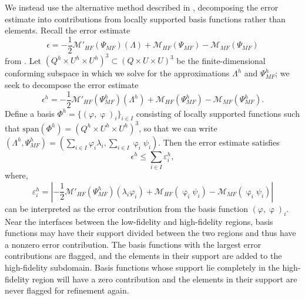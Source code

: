 \documentclass[review,sort&compress]{elsarticle}
\theoremstyle{plain} %
\theoremstyle{definition} %
\begin{document}
We instead use the alternative method described in \cite{vanOpstaletal15}, decomposing the error estimate into contributions from locally supported basis functions rather than elements. Recall the error estimate 
%
\begin{equation}
\epsilon=-\frac{1}{2}\mathcal{M}'_{HF}(\Psi_{MF})(\Lambda)+\mathcal M_{HF}(\Psi_{MF})-\mathcal M_{MF}(\Psi_{MF})
\end{equation}
%
from . Let $(Q^h\times U^h\times U^h)^3 \subset (Q\times U\times U)^3$ be the finite-dimensional conforming subspace in which we solve for the approximations $\Lambda^h$ and $\Psi_{MF}^h$; we seek to decompose the error estimate
%
\begin{equation}
\epsilon^h=-\frac{1}{2}\mathcal{M}'_{HF}(\Psi_{MF}^h)(\Lambda^h)+\mathcal M_{HF}(\Psi_{MF}^h)-\mathcal M_{MF}(\Psi_{MF}^h).
\end{equation}
%
Define a basis $\Phi^h=\{(\varphi,\upvarphi)_i\}_{i\in I}$ consisting of locally supported functions such that $\textrm{span}(\Phi^h)=(Q^h\times U^h\times U^h)^3$, so that we can write $(\Lambda^h,\Psi_{MF}^h)=(\sum\limits_{i\in I}\varphi_i\lambda_i,\sum\limits_{i\in I}\upvarphi_i \psi_i)$. Then the error estimate satisfies
%
\begin{equation}
\epsilon^h \leq \sum_{i\in I} \varepsilon^h_i,
\end{equation}
%
where,
%
\begin{equation}\label{eq:basisblame}
\varepsilon^h_i = \left| -\frac{1}{2}\mathcal{M}'_{HF}(\Psi_{MF}^h)(\lambda_i\varphi_i)+\mathcal M_{HF}(\upvarphi_i \psi_i)-\mathcal M_{MF}(\upvarphi_i \psi_i) \right|
\end{equation}
%
can be interpreted as the error contribution from the basis function $(\varphi,\upvarphi)_i$. Near the interfaces between the low-fidelity and high-fidelity regions, basis functions may have their support divided between the two regions and thus have a nonzero error contribution. The basis functions with the largest error contributions are flagged, and the elements in their support are added to the high-fidelity subdomain. Basis functions whose support lie completely in the high-fidelity region will have a zero contribution and the elements in their support are never flagged for refinement again. 
\end{document}
